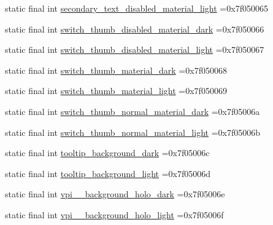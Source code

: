 \begin{DoxyCompactItemize}
\item 
static final int \mbox{\hyperlink{classcom_1_1example_1_1trainawearapplication_1_1_r_1_1color_a9b349103af21ac7881468395d296ba10}{secondary\+\_\+text\+\_\+disabled\+\_\+material\+\_\+light}} =0x7f050065
\item 
static final int \mbox{\hyperlink{classcom_1_1example_1_1trainawearapplication_1_1_r_1_1color_a007476275c8f2817c471e8515ef2dd77}{switch\+\_\+thumb\+\_\+disabled\+\_\+material\+\_\+dark}} =0x7f050066
\item 
static final int \mbox{\hyperlink{classcom_1_1example_1_1trainawearapplication_1_1_r_1_1color_a75a3186592606b68d5fbc45caa577a72}{switch\+\_\+thumb\+\_\+disabled\+\_\+material\+\_\+light}} =0x7f050067
\item 
static final int \mbox{\hyperlink{classcom_1_1example_1_1trainawearapplication_1_1_r_1_1color_aaef5f49a1e702adeaf497667b337a3d5}{switch\+\_\+thumb\+\_\+material\+\_\+dark}} =0x7f050068
\item 
static final int \mbox{\hyperlink{classcom_1_1example_1_1trainawearapplication_1_1_r_1_1color_a3f6a6b3215907c38913ba3a7a85344fe}{switch\+\_\+thumb\+\_\+material\+\_\+light}} =0x7f050069
\item 
static final int \mbox{\hyperlink{classcom_1_1example_1_1trainawearapplication_1_1_r_1_1color_aac9ab7de98a0f8049c7c5b16ca42fe08}{switch\+\_\+thumb\+\_\+normal\+\_\+material\+\_\+dark}} =0x7f05006a
\item 
static final int \mbox{\hyperlink{classcom_1_1example_1_1trainawearapplication_1_1_r_1_1color_a86626002efcb0b5c9210f472cca50b04}{switch\+\_\+thumb\+\_\+normal\+\_\+material\+\_\+light}} =0x7f05006b
\item 
static final int \mbox{\hyperlink{classcom_1_1example_1_1trainawearapplication_1_1_r_1_1color_af9e71a000d691ae201918d0d3d2a62fd}{tooltip\+\_\+background\+\_\+dark}} =0x7f05006c
\item 
static final int \mbox{\hyperlink{classcom_1_1example_1_1trainawearapplication_1_1_r_1_1color_a3f54d0fa211cc2629e643d9a4f363a8d}{tooltip\+\_\+background\+\_\+light}} =0x7f05006d
\item 
static final int \mbox{\hyperlink{classcom_1_1example_1_1trainawearapplication_1_1_r_1_1color_a55aa33dd59e8c6eedd6da1f010164992}{vpi\+\_\+\+\_\+background\+\_\+holo\+\_\+dark}} =0x7f05006e
\item 
static final int \mbox{\hyperlink{classcom_1_1example_1_1trainawearapplication_1_1_r_1_1color_a2febef004c88b5a5e3d2cd4de00b86ae}{vpi\+\_\+\+\_\+background\+\_\+holo\+\_\+light}} =0x7f05006f

\end{DoxyCompactItemize}

